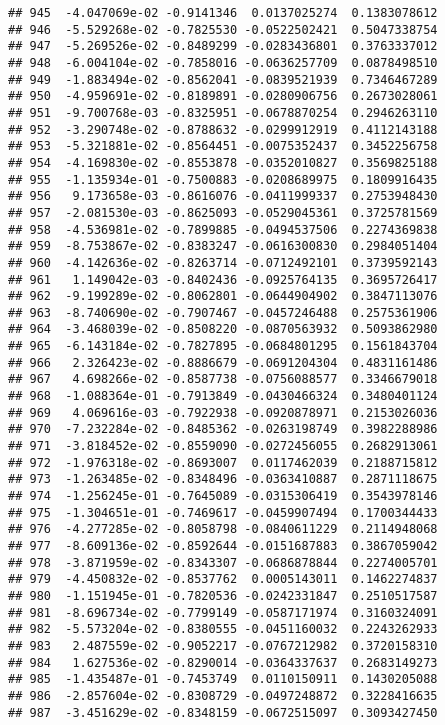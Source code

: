 \documentclass[
]{article}
\begin{document}
\begin{verbatim}
## 945  -4.047069e-02 -0.9141346  0.0137025274  0.1383078612
## 946  -5.529268e-02 -0.7825530 -0.0522502421  0.5047338754
## 947  -5.269526e-02 -0.8489299 -0.0283436801  0.3763337012
## 948  -6.004104e-02 -0.7858016 -0.0636257709  0.0878498510
## 949  -1.883494e-02 -0.8562041 -0.0839521939  0.7346467289
## 950  -4.959691e-02 -0.8189891 -0.0280906756  0.2673028061
## 951  -9.700768e-03 -0.8325951 -0.0678870254  0.2946263110
## 952  -3.290748e-02 -0.8788632 -0.0299912919  0.4112143188
## 953  -5.321881e-02 -0.8564451 -0.0075352437  0.3452256758
## 954  -4.169830e-02 -0.8553878 -0.0352010827  0.3569825188
## 955  -1.135934e-01 -0.7500883 -0.0208689975  0.1809916435
## 956   9.173658e-03 -0.8616076 -0.0411999337  0.2753948430
## 957  -2.081530e-03 -0.8625093 -0.0529045361  0.3725781569
## 958  -4.536981e-02 -0.7899885 -0.0494537506  0.2274369838
## 959  -8.753867e-02 -0.8383247 -0.0616300830  0.2984051404
## 960  -4.142636e-02 -0.8263714 -0.0712492101  0.3739592143
## 961   1.149042e-03 -0.8402436 -0.0925764135  0.3695726417
## 962  -9.199289e-02 -0.8062801 -0.0644904902  0.3847113076
## 963  -8.740690e-02 -0.7907467 -0.0457246488  0.2575361906
## 964  -3.468039e-02 -0.8508220 -0.0870563932  0.5093862980
## 965  -6.143184e-02 -0.7827895 -0.0684801295  0.1561843704
## 966   2.326423e-02 -0.8886679 -0.0691204304  0.4831161486
## 967   4.698266e-02 -0.8587738 -0.0756088577  0.3346679018
## 968  -1.088364e-01 -0.7913849 -0.0430466324  0.3480401124
## 969   4.069616e-03 -0.7922938 -0.0920878971  0.2153026036
## 970  -7.232284e-02 -0.8485362 -0.0263198749  0.3982288986
## 971  -3.818452e-02 -0.8559090 -0.0272456055  0.2682913061
## 972  -1.976318e-02 -0.8693007  0.0117462039  0.2188715812
## 973  -1.263485e-02 -0.8348496 -0.0363410887  0.2871118675
## 974  -1.256245e-01 -0.7645089 -0.0315306419  0.3543978146
## 975  -1.304651e-01 -0.7469617 -0.0459907494  0.1700344433
## 976  -4.277285e-02 -0.8058798 -0.0840611229  0.2114948068
## 977  -8.609136e-02 -0.8592644 -0.0151687883  0.3867059042
## 978  -3.871959e-02 -0.8343307 -0.0686878844  0.2274005701
## 979  -4.450832e-02 -0.8537762  0.0005143011  0.1462274837
## 980  -1.151945e-01 -0.7820536 -0.0242331847  0.2510517587
## 981  -8.696734e-02 -0.7799149 -0.0587171974  0.3160324091
## 982  -5.573204e-02 -0.8380555 -0.0451160032  0.2243262933
## 983   2.487559e-02 -0.9052217 -0.0767212982  0.3720158310
## 984   1.627536e-02 -0.8290014 -0.0364337637  0.2683149273
## 985  -1.435487e-01 -0.7453749  0.0110150911  0.1430205088
## 986  -2.857604e-02 -0.8308729 -0.0497248872  0.3228416635
## 987  -3.451629e-02 -0.8348159 -0.0672515097  0.3093427450

\end{verbatim}
\end{document}
